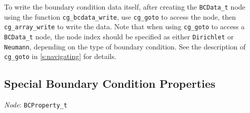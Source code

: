 To write the boundary condition data itself, after creating the
\texttt{BCData\_t} node using the function \texttt{cg\_bcdata\_write}, use
\texttt{cg\_goto} to access the node, then \texttt{cg\_array\_write} to
write the data.
Note that when using \texttt{cg\_goto} to access a \texttt{BCData\_t}
node, the node index should be specified as either \texttt{Dirichlet} or
\texttt{Neumann}, depending on the type of boundary condition.
See the description of \texttt{cg\_goto} in \autoref{s:navigating} for
details.

\newpage
\subsection{Special Boundary Condition Properties}
\label{s:bcproperty}

\noindent
\textit{Node}: \texttt{BCProperty\_t}

